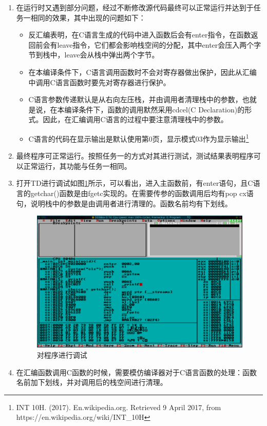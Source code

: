 \documentclass{article}
\begin{document}
\begin{enumerate}
		\item 在运行时又遇到部分问题，经过不断修改源代码最终可以正常运行并达到于任务一相同的效果，其中出现的问题如下：
			\begin{itemize}
				\item 反汇编表明，在C语言生成的代码中进入函数后会有enter指令，在函数返回前会有leave指令，它们都会影响栈空间的分配，其中enter会压入两个字节到栈中，leave会从栈中弹出两个字节。
				\item 在本编译条件下，C语言调用函数时不会对寄存器做出保护，因此从汇编中调用C语言函数时要先对寄存器进行保护。
				\item C语言参数传递默认是从右向左压栈，并由调用者清理栈中的参数，也就是说，在本编译条件下，函数的调用默然采用cdcel(C Declaration)的形式。因此，在汇编调用C语言的过程中要注意清理栈中的参数。
				\item C语言的代码在显示输出是默认使用第0页，显示模式03作为显示输出\footnote{INT 10H. (2017). En.wikipedia.org. Retrieved 9 April 2017, from https://en.wikipedia.org/wiki/INT\_10H}
			\end{itemize}

		\item 最终程序可正常运行。按照任务一的方式对其进行测试，测试结果表明程序可以正常运行，其功能与任务一相同。
		\item 打开TD进行调试如图\ref{fig:deasm}所示，可以看出，进入主函数前，有enter语句，且C语言的getchar()函数是由fgetc实现的。在需要传参的函数调用后均有pop cx语句，说明栈中的参数是由调用者进行清理的。函数名前均有下划线。
			\begin{figure}[h]
				\centering
				\includegraphics[width=0.9\linewidth]{res/homework_3/deasm.png}
				\caption{对程序进行调试}
				\label{fig:deasm}
			\end{figure}
		\item 在汇编函数调用C函数的时候，需要模仿编译器对于C语言函数的处理：函数名前加下划线，并对调用后的栈空间进行清理。
	\end{enumerate}
\end{document}
